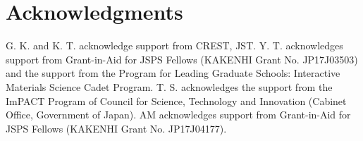 \documentclass[prl,twocolumn,superscriptaddress,nofootinbib]{revtex4}
\begin{document}
\section*{Acknowledgments}
G. K. and K. T. acknowledge support from CREST, JST. 
Y. T. acknowledges support from Grant-in-Aid for JSPS Fellows (KAKENHI Grant No. JP17J03503) and
the support from the Program for Leading Graduate Schools: Interactive Materials Science Cadet Program.
T. S. acknowledges the support from the ImPACT Program of Council for Science, Technology and Innovation
(Cabinet Office, Government of Japan).
AM acknowledges support from Grant-in-Aid for JSPS Fellows (KAKENHI Grant No. JP17J04177). 



\appendix
\end{document}
